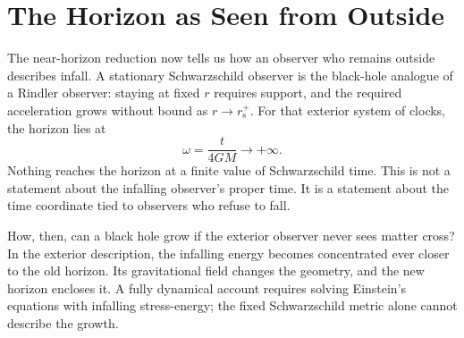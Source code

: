 \section{The Horizon as Seen from Outside}

The near-horizon reduction now tells us how an observer who remains
outside describes infall.  A stationary Schwarzschild observer is the
black-hole analogue of a Rindler observer: staying at fixed \(r\)
requires support, and the required acceleration grows without bound as
\(r\to r_{\mathrm s}^{+}\).  For that exterior system of clocks, the
horizon lies at
\[
  \omega=\frac{t}{4GM}\longrightarrow+\infty .
\]
Nothing reaches the horizon at a finite value of Schwarzschild time.
This is not a statement about the infalling observer's proper time.
It is a statement about the time coordinate tied to observers who
refuse to fall.

\begin{classroomqa}
\end{classroomqa}

How, then, can a black hole grow if the exterior observer never sees
matter cross?  In the exterior description, the infalling energy
becomes concentrated ever closer to the old horizon.  Its
gravitational field changes the geometry, and the new horizon encloses
it.  A fully dynamical account requires solving Einstein's equations
with infalling stress-energy; the fixed Schwarzschild metric alone
cannot describe the growth.

\begin{classroomqa}
\end{classroomqa}

